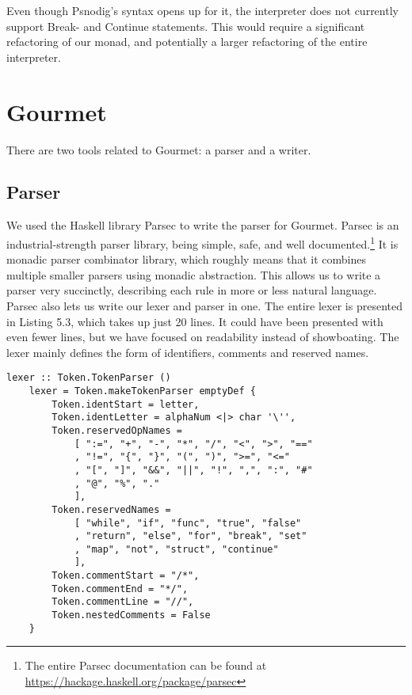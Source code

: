 Even though Psnodig's syntax opens up for it, the interpreter does not currently support Break- and Continue statements. This would require a significant refactoring of our monad, and potentially a larger refactoring of the entire interpreter. \hfill \\


\section{Gourmet}

There are two tools related to Gourmet: a parser and a writer. 

\subsection{Parser}

We used the Haskell library Parsec to write the parser for Gourmet. Parsec is an industrial-strength parser library, being simple, safe, and well documented.\footnote{The entire Parsec documentation can be found at \url{https://hackage.haskell.org/package/parsec}} It is monadic parser combinator library, which roughly means that it combines multiple smaller parsers using monadic abstraction. This allows us to write a parser very succinctly, describing each rule in more or less natural language. \hfill \\

Parsec also lets us write our lexer and parser in one. The entire lexer is presented in Listing 5.3, which takes up just 20 lines. It could have been presented with even fewer lines, but we have focused on readability instead of showboating. The lexer mainly defines the form of identifiers, comments and reserved names. \hfill \\

\begin{lstlisting}[caption={The Gourmet lexer}, captionpos=b]
    lexer :: Token.TokenParser ()
    lexer = Token.makeTokenParser emptyDef {
        Token.identStart = letter,
        Token.identLetter = alphaNum <|> char '\'',
        Token.reservedOpNames =
            [ ":=", "+", "-", "*", "/", "<", ">", "=="
            , "!=", "{", "}", "(", ")", ">=", "<="
            , "[", "]", "&&", "||", "!", ",", ":", "#"
            , "@", "%", "."
            ],
        Token.reservedNames =
            [ "while", "if", "func", "true", "false"
            , "return", "else", "for", "break", "set"
            , "map", "not", "struct", "continue"
            ],
        Token.commentStart = "/*",
        Token.commentEnd = "*/",
        Token.commentLine = "//",
        Token.nestedComments = False
    }
\end{lstlisting}

